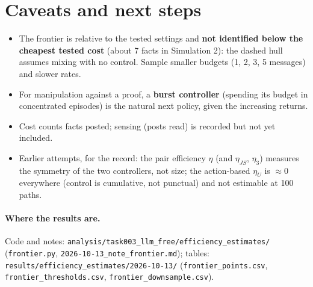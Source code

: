 \documentclass[10pt,a4paper]{article}
\begin{document}
\section{Caveats and next steps}

\begin{itemize}\itemsep1pt
\item The frontier is relative to the tested settings and \textbf{not identified below the cheapest
  tested cost} (about 7 facts in Simulation 2): the dashed hull assumes mixing with no control. Sample
  smaller budgets (1, 2, 3, 5 messages) and slower rates.
\item For manipulation against a proof, a \textbf{burst controller} (spending its budget in concentrated
  episodes) is the natural next policy, given the increasing returns.
\item Cost counts facts posted; sensing (posts read) is recorded but not yet included.
\item Earlier attempts, for the record: the pair efficiency $\eta$ (and $\eta_{JS}$, $\eta_3$) measures the
  symmetry of the two controllers, not size; the action-based $\eta_U$ is $\approx 0$ everywhere (control is
  cumulative, not punctual) and not estimable at 100 paths.
\end{itemize}

\paragraph{Where the results are.} Code and notes:
\texttt{analysis/task003\_llm\_free/efficiency\_estimates/} (\texttt{frontier.py},
\texttt{2026-10-13\_note\_frontier.md}); tables: \texttt{results/efficiency\_estimates/2026-10-13/}
(\texttt{frontier\_points.csv}, \texttt{frontier\_thresholds.csv}, \texttt{frontier\_downsample.csv}).
\end{document}
